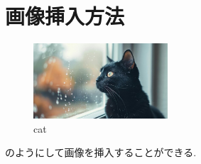 \documentclass[../sample.tex]{subfiles}
\begin{document}
    \section{画像挿入方法}

        \begin{figure}[h]
            \centering
            \includegraphics[width=50mm]{../imgs/sub1/cat.jpg}
            \caption{cat}
        \end{figure}

        のようにして画像を挿入することができる.
\end{document}
